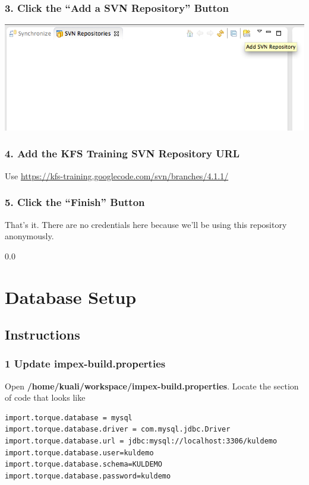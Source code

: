 \documentclass[12pt,notitlepage]{article}
\begin{document}
\subsubsection*{3. Click the ``Add a SVN Repository'' Button}
\includegraphics[width=\textwidth]{screenshots/Lesson1_2SS7.png}

\subsubsection*{4. Add the KFS Training SVN Repository URL}
Use \url{https://kfs-training.googlecode.com/svn/branches/4.1.1/}

\subsubsection*{5. Click the ``Finish'' Button}
That's it. There are no credentials here because we'll be using this
repository anonymously.

{\setlength{\baselineskip}%
  {0.0\baselineskip}
  \section*{\flushright Database Setup}
  \hrulefill \par}

\subsection*{Instructions}
\subsubsection*{1 Update impex-build.properties}
Open \textbf{/home/kuali/workspace/impex-build.properties}. Locate the section of code that looks like
\begin{verbatim}
import.torque.database = mysql
import.torque.database.driver = com.mysql.jdbc.Driver
import.torque.database.url = jdbc:mysql://localhost:3306/kuldemo
import.torque.database.user=kuldemo
import.torque.database.schema=KULDEMO
import.torque.database.password=kuldemo
\end{verbatim}
\end{document}
